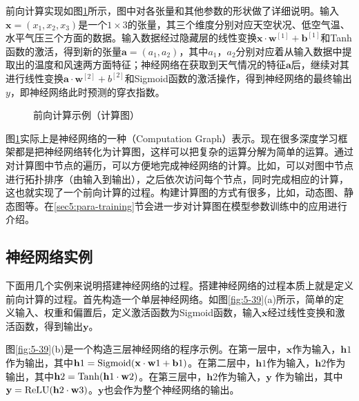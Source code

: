 \parinterval 前向计算实现如图\ref{fig:5-38}所示，图中对各张量和其他参数的形状做了详细说明。输入$ \mathbf x=(x_1,x_2,x_3) $是一个$1\times 3$的张量，其三个维度分别对应天空状况、低空气温、水平气压三个方面的数据。输入数据经过隐藏层的线性变换$ \mathbf x\cdot \mathbf w^{[1]}+\mathbf b^{[1]}$和Tanh函数的激活，得到新的张量$ \mathbf a=(a_1,a_2) $，其中$a_1$，$a_2$分别对应着从输入数据中提取出的温度和风速两方面特征；神经网络在获取到天气情况的特征$ \mathbf a $后，继续对其进行线性变换$ \mathbf a\cdot \mathbf w^{[2]}+ b^{[2]} $和Sigmoid函数的激活操作，得到神经网络的最终输出$ y $，即神经网络此时预测的穿衣指数。
\begin{figure}[htp]
\centering

\caption{前向计算示例（计算图）}
\label{fig:5-38}
\end{figure}

\parinterval 图\ref{fig:5-38}实际上是神经网络的一种{\small{}}（Computation Graph）表示。现在很多深度学习框架都是把神经网络转化为计算图，这样可以把复杂的运算分解为简单的运算。通过对计算图中节点的遍历，可以方便地完成神经网络的计算。比如，可以对图中节点进行拓扑排序（由输入到输出），之后依次访问每个节点，同时完成相应的计算，这也就实现了一个前向计算的过程。构建计算图的方式有很多，比如，动态图、静态图等。在\ref{sec5:para-training}节会进一步对计算图在模型参数训练中的应用进行介绍。


\subsection{神经网络实例}

\parinterval 下面用几个实例来说明搭建神经网络的过程。搭建神经网络的过程本质上就是定义前向计算的过程。首先构造一个单层神经网络。如图\ref{fig:5-39}(a)所示，简单的定义输入、权重和偏置后，定义激活函数为Sigmoid函数，输入$ \mathbf x $经过线性变换和激活函数，得到输出$ \mathbf y $。

\parinterval 图\ref{fig:5-39}(b)是一个构造三层神经网络的程序示例。在第一层中，$ \mathbf x $作为输入，$ \mathbf h1 $作为输出，其中$ \mathbf h1={\rm{Sigmoid}}(\mathbf x\cdot \mathbf w1+\mathbf b1) $。在第二层中，$ \mathbf h1 $作为输入，$ \mathbf h2 $作为输出，其中$ \mathbf h2={\rm{Tanh}}(\mathbf h1\cdot \mathbf w2) $。在第三层中，$ \mathbf h2 $作为输入，$ \mathbf y $ 作为输出，其中$ \mathbf y={\rm{ReLU}}(\mathbf h2\cdot \mathbf w3) $。$ \mathbf y $也会作为整个神经网络的输出。

